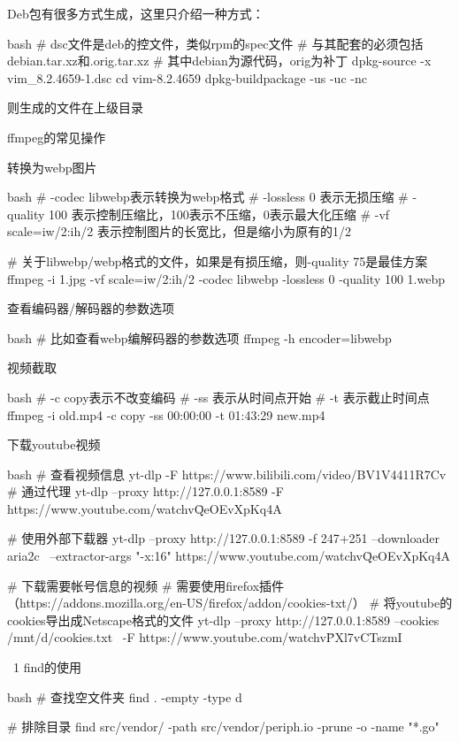 \begin{outline}[enumerate]
Deb包有很多方式生成，这里只介绍一种方式：
\begin{code-block}{bash}
# dsc文件是deb的控文件，类似rpm的spec文件
# 与其配套的必须包括debian.tar.xz和.orig.tar.xz
# 其中debian为源代码，orig为补丁
dpkg-source -x  vim_8.2.4659-1.dsc
cd vim-8.2.4659
dpkg-buildpackage -us -uc -nc
\end{code-block}

则生成的文件在上级目录

\1 ffmpeg的常见操作

\2 转换为webp图片

\begin{code-block}{bash}
# -codec libwebp表示转换为webp格式
# -lossless 0 表示无损压缩
# -quality 100 表示控制压缩比，100表示不压缩，0表示最大化压缩
# -vf scale=iw/2:ih/2 表示控制图片的长宽比，但是缩小为原有的1/2

# 关于libwebp/webp格式的文件，如果是有损压缩，则-quality 75是最佳方案
ffmpeg -i 1.jpg  -vf scale=iw/2:ih/2 -codec libwebp -lossless 0 -quality 100 1.webp
\end{code-block}

\2 查看编码器/解码器的参数选项

\begin{code-block}{bash}
# 比如查看webp编解码器的参数选项
ffmpeg -h encoder=libwebp
\end{code-block}

\2 视频截取
\begin{code-block}{bash}
# -c copy表示不改变编码
# -ss 表示从时间点开始
# -t 表示截止时间点
ffmpeg -i old.mp4 -c copy -ss 00:00:00 -t 01:43:29 new.mp4
\end{code-block}

\1 下载youtube视频

\begin{code-block}{bash}
# 查看视频信息
yt-dlp -F https://www.bilibili.com/video/BV1V4411R7Cv
# 通过代理
yt-dlp --proxy http://127.0.0.1:8589 -F https://www.youtube.com/watch\?v\=QeOEvXpKq4A

# 使用外部下载器
yt-dlp --proxy http://127.0.0.1:8589 -f 247+251 --downloader aria2c \
  --extractor-args "-x:16" https://www.youtube.com/watch\?v\=QeOEvXpKq4A

# 下载需要帐号信息的视频
# 需要使用firefox插件（https://addons.mozilla.org/en-US/firefox/addon/cookies-txt/）
# 将youtube的cookies导出成Netscape格式的文件
yt-dlp --proxy http://127.0.0.1:8589 --cookies /mnt/d/cookies.txt \
  -F https://www.youtube.com/watch\?v\=PXl7vCTszmI
\end{code-block}

\ 1 find的使用

\begin{code-block}{bash}
# 查找空文件夹
find . -empty -type d

# 排除目录
find src/vendor/ -path src/vendor/periph.io -prune -o -name "*.go"
\end{code-block}

\end{outline}




